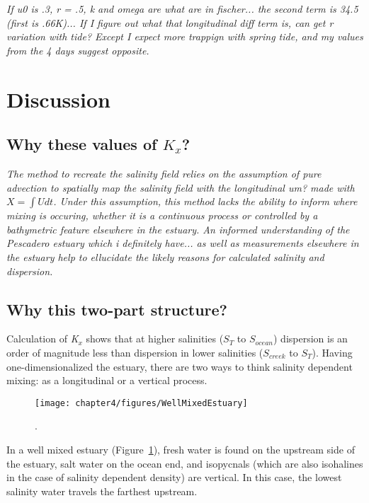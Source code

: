 \emph{If u0 is .3, r = .5, k and omega are what are in fischer... the second term is 34.5 (first is .66K)... If I figure out what that longitudinal diff term is, can get r variation with tide? Except I expect more trappign with spring tide, and my values from the 4 days suggest opposite.}

\section{Discussion} \label{sec:discCh4}
\subsection{Why these values of $K_x$?}

\emph{The method to recreate the salinity field relies on the assumption of pure advection to spatially map the salinity field with the longitudinal \emph{um?} made with $X = \int{U}dt$. Under this assumption, this method lacks the ability to inform where mixing is occuring, whether it is a continuous process or controlled by a bathymetric feature elsewhere in the estuary. An informed understanding of the Pescadero estuary \emph{which i definitely have...} as well as measurements elsewhere in the estuary help to ellucidate the likely reasons for \emph{calculated} salinity and dispersion.}

\subsection{Why this two-part structure?}

Calculation of \emph{K$_x$} shows that at higher salinities ($S_T$ to $S_{ocean}$) dispersion is an order of magnitude less than dispersion in lower salinities ($S_{creek}$ to $S_T$). Having one-dimensionalized the estuary, there are two ways to think salinity dependent mixing: as a longitudinal or a vertical process. 

\begin{figure}[h]
\centering
	\texttt{[image: chapter4/figures/WellMixedEstuary]}
	\caption{.} \label{fig:WellMixedEstuary}
\end{figure}

In a well mixed estuary (Figure~\ref{fig:WellMixedEstuary}), fresh water is found on the upstream side of the estuary, salt water on the ocean end, and isopycnals (which are also isohalines in the case of salinity dependent density) are vertical. In this case, the lowest salinity water travels the farthest upstream.

